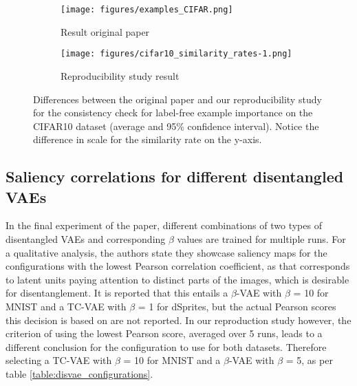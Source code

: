 \begin{figure}[H]
\centering
\begin{subfigure}{0.495\textwidth}
    \texttt{[image: figures/examples\_CIFAR.png]}
    \caption{Result original paper}
\end{subfigure}
\hfill
\begin{subfigure}{0.495\textwidth}
    \texttt{[image: figures/cifar10\_similarity\_rates-1.png]}
    \caption{Reproducibility study result}
\end{subfigure}

        
\caption{Differences between the original paper and our reproducibility study for the consistency check for label-free example importance on the CIFAR10 dataset (average and 95\% confidence interval). Notice the difference in scale for the similarity rate on the y-axis. }
\label{fig:difference_example_figures}
\end{figure}

\subsection{Saliency correlations for different disentangled VAEs}
\label{section:disvae_correlations}
In the final experiment of the paper, different combinations of two types of disentangled VAEs and corresponding $\beta$ values are trained for multiple runs. For a qualitative analysis, the authors state they showcase saliency maps for the configurations with the lowest Pearson correlation coefficient, as that corresponds to latent units paying attention to distinct parts of the images, which is desirable for disentanglement. It is reported that this entails a $\beta$-VAE with $\beta$ = 10 for MNIST and a TC-VAE with $\beta$ = 1 for dSprites, but the actual Pearson scores this decision is based on are not reported. In our reproduction study however, the criterion of using the lowest Pearson score, averaged over 5 runs, leads to a different conclusion for the configuration to use for both datasets. Therefore selecting a TC-VAE with $\beta$ = 10 for MNIST and a $\beta$-VAE with $\beta$ = 5, as per table \ref{table:disvae_configurations}.

